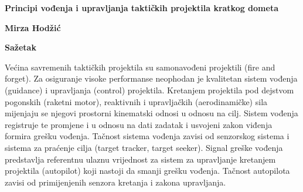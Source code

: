 \thispagestyle{plain}
\begin{center}
    \Large
    \textbf{Principi vođenja i upravljanja taktičkih projektila kratkog dometa}
    
    \vspace{0.4cm}
        
    \vspace{0.4cm}
    \textbf{Mirza Hodžić}
    
    \vspace{0.9cm}
    \textbf{Sažetak}
\end{center}
Većina savremenih taktičkih projektila su samonavođeni projektili (fire and forget). Za
osiguranje visoke performanse neophodan je kvalitetan sistem vođenja (guidance) i
upravljanja (control) projektila. Kretanjem projektila pod dejstvom pogonskih (raketni
motor), reaktivnih i upravljačkih (aerodinamičke) sila mijenjaju se njegovi prostorni
kinematski odnosi u odnosu na cilj. Sistem vođenja registruje te promjene i u odnosu na dati
zadatak i usvojeni zakon viđenja formira grešku vođenja. Tačnost sistema vođenja zavisi od
senzorskog sistema i sistema za praćenje cilja (target tracker, target seeker). Signal greške
vođenja predstavlja referentnu ulaznu vrijednost za sistem za upravljanje kretanjem projektila
(autopilot) koji nastoji da smanji grešku vođenja. Tačnost autopilota zavisi od primijenjenih
senzora kretanja i zakona upravljanja.